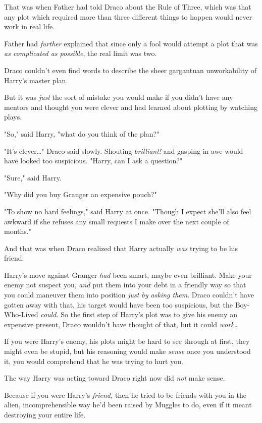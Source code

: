 That was when Father had told Draco about the Rule of Three, which was that any
plot which required more than three different things to happen would never work
in real life.

Father had \emph{further} explained that since only a fool would attempt a plot
that was \emph{as complicated as possible}, the real limit was two.

Draco couldn't even find words to describe the sheer gargantuan unworkability
of Harry's master plan.

But it was \emph{just} the sort of mistake you would make if you didn't have
any mentors and thought you were clever and had learned about plotting by
watching plays.

"So," said Harry, "what do you think of the plan?"

"It's clever{\ldots}" Draco said slowly. Shouting \emph{brilliant!} and gasping
in awe would have looked too suspicious. "Harry, can I ask a question?"

"Sure," said Harry.

"Why did you buy Granger an expensive pouch?"

"To show no hard feelings," said Harry at once. "Though I expect she'll also
feel awkward if she refuses any small requests I make over the next couple of
months."

And that was when Draco realized that Harry actually \emph{was} trying to be
his friend.

Harry's move against Granger \emph{had} been smart, maybe even brilliant. Make
your enemy not suspect you, \emph{and} put them into your debt in a friendly
way so that you could maneuver them into position \emph{just by asking them}.
Draco couldn't have gotten away with that, his target would have been too
suspicious, but the Boy-Who-Lived \emph{could.} So the first step of Harry's
plot was to give his enemy an expensive present, Draco wouldn't have thought of
that, but it could \emph{work{\ldots}}

If you were Harry's enemy, his plots might be hard to see through at first,
they might even be stupid, but his reasoning would make \emph{sense} once you
understood it, you would comprehend that he was trying to hurt you.

The way Harry was acting toward Draco right now did \emph{not} make sense.

Because if you were Harry's \emph{friend,} then he tried to be friends with you
in the alien, incomprehensible way he'd been raised by Muggles to do, even if
it meant destroying your entire life.

